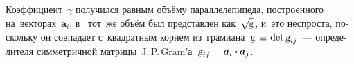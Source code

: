 \begin{otherlanguage}{russian}
\vspace{-0.1em} \noindent Коэффициент~$\gamma$ получился равным объёму параллелепипеда, построенного на~векторах~$\bm{a}_i$; в~ тот~же объём был представлен как~\!${\sqrt{\hspace{-0.36ex}\mathstrut{\textsl{g}}}\hspace{0.16ex}}$, и~это неспроста, поскольку он совпадает с~квадратным корнем из~грамиана~\hbox{$\textsl{g} \hspace{0.1ex} \hspace{0.25ex} \equiv \hspace{0.2ex} \operatorname{det} \textsl{g}_{ij}$\hspace{-0.12ex}}~--- определителя симметричной матрицы~\hbox{J.\,P.\,Gram’а}~${\textsl{g}_{ij} \hspace{-0.1ex} \hspace{0.16ex} \equiv \hspace{0.2ex} \bm{a}_i \dotp \bm{a}_j}$.



\end{otherlanguage}
